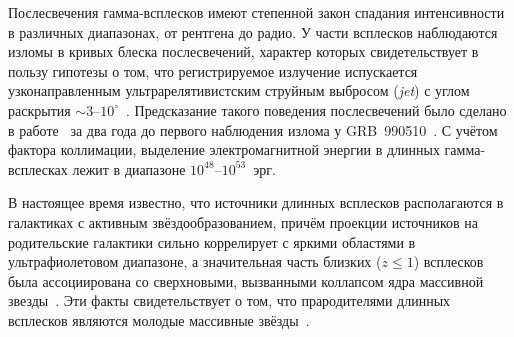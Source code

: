
Послесвечения гамма-всплесков имеют степенной закон спадания интенсивности в различных
диапазонах, от рентгена до радио. У части всплесков наблюдаются изломы в кривых блеска послесвечений,
характер которых свидетельствует в пользу гипотезы о том, что регистрируемое излучение испускается
узконаправленным ультрарелятивистским струйным выбросом (\textit{jet}) с углом раскрытия 
$\sim 3\mbox{--}10^{\circ}$~\citep{Rhoads_1999ApJ}. 
Предсказание такого поведения послесвечений было сделано в работе~\citep{Rhoads_1997ApJL} 
за два года до первого наблюдения излома у GRB~990510~\citep{Stanek_1999ApJ}. 
С учётом фактора коллимации, выделение электромагнитной энергии в длинных 
гамма-всплесках лежит в диапазоне $10^{48}$--$10^{53}$~эрг.

В настоящее время известно, что источники длинных всплесков располагаются в галактиках 
с активным звёздообразованием, причём проекции источников на родительские галактики сильно
коррелирует с яркими областями в ультрафиолетовом диапазоне, а значительная часть 
близких ($z \le 1$) всплесков была ассоциирована со сверхновыми, вызванными 
коллапсом ядра массивной звезды~\citep{Hjorth_and_Bloom_2012in_book}.
Эти факты свидетельствует о том, что прародителями длинных всплесков являются молодые 
массивные звёзды~\citep[см. обзор][]{Berger_2014ARAA}.

